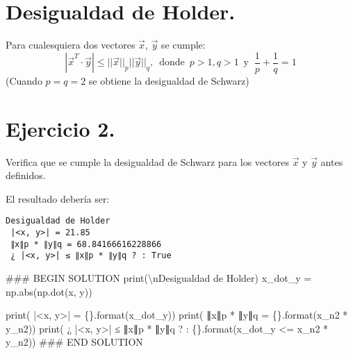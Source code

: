 \documentclass[
  letterpaper,
  DIV=11,
  numbers=noendperiod]{scrreprt}
\newenvironment{Shaded}{\begin{snugshade}}{\end{snugshade}}
\newcommand{\BuiltInTok}[1]{\textcolor[rgb]{0.00,0.23,0.31}{#1}}
\newcommand{\CharTok}[1]{\textcolor[rgb]{0.13,0.47,0.30}{#1}}
\newcommand{\CommentTok}[1]{\textcolor[rgb]{0.37,0.37,0.37}{#1}}
\newcommand{\NormalTok}[1]{\textcolor[rgb]{0.00,0.23,0.31}{#1}}
\newcommand{\OperatorTok}[1]{\textcolor[rgb]{0.37,0.37,0.37}{#1}}
\newcommand{\RegionMarkerTok}[1]{\textcolor[rgb]{0.00,0.23,0.31}{#1}}
\newcommand{\SpecialCharTok}[1]{\textcolor[rgb]{0.37,0.37,0.37}{#1}}
\newcommand{\StringTok}[1]{\textcolor[rgb]{0.13,0.47,0.30}{#1}}
\begin{document}
\section{Desigualdad de Holder.}\label{desigualdad-de-holder.}

Para cualesquiera dos vectores \(\vec{x}\), \(\vec{y}\) se cumple: \[
|\vec{x}^T \cdot \vec{y}| \le ||\vec{x}||_p ||\vec{y}||_q, \,\,\, \mbox{donde}
\,\,\, p > 1, q > 1 \,\,\, \mbox{y} \;\; \frac{1}{p} + \frac{1}{q} = 1
\] (Cuando \(p = q = 2\) se obtiene la desigualdad de Schwarz)

\section{\texorpdfstring{\textbf{Ejercicio
2.}}{Ejercicio 2.}}\label{ejercicio-2.-2}

Verifica que se cumple la desigualdad de Schwarz para los vectores
\(\vec{x}\) y \(\vec{y}\) antes definidos.

El resultado debería ser:

\begin{verbatim}
Desigualdad de Holder
 |<x, y>| = 21.85
 ∥x∥p * ∥y∥q = 68.84166616228866
 ¿ |<x, y>| ≤ ∥x∥p * ∥y∥q ? : True
\end{verbatim}

\begin{Shaded}
\begin{Highlighting}[]
\CommentTok{\#\#\# }\RegionMarkerTok{BEGIN}\CommentTok{ SOLUTION}
\BuiltInTok{print}\NormalTok{(}\StringTok{\textquotesingle{}}\CharTok{\textbackslash{}n}\StringTok{Desigualdad de Holder\textquotesingle{}}\NormalTok{)}
\NormalTok{x\_dot\_y }\OperatorTok{=}\NormalTok{ np.}\BuiltInTok{abs}\NormalTok{(np.dot(x, y))}

\BuiltInTok{print}\NormalTok{(}\StringTok{\textquotesingle{} |\textless{}x, y\textgreater{}| = }\SpecialCharTok{\{\}}\StringTok{\textquotesingle{}}\NormalTok{.}\BuiltInTok{format}\NormalTok{(x\_dot\_y))}
\BuiltInTok{print}\NormalTok{(}\StringTok{\textquotesingle{} ∥x∥p * ∥y∥q = }\SpecialCharTok{\{\}}\StringTok{\textquotesingle{}}\NormalTok{.}\BuiltInTok{format}\NormalTok{(x\_n2 }\OperatorTok{*}\NormalTok{ y\_n2))}
\BuiltInTok{print}\NormalTok{(}\StringTok{\textquotesingle{} ¿ |\textless{}x, y\textgreater{}| ≤ ∥x∥p * ∥y∥q ? : }\SpecialCharTok{\{\}}\StringTok{\textquotesingle{}}\NormalTok{.}\BuiltInTok{format}\NormalTok{(x\_dot\_y }\OperatorTok{\textless{}=}\NormalTok{ x\_n2 }\OperatorTok{*}\NormalTok{ y\_n2))}
\CommentTok{\#\#\# }\RegionMarkerTok{END}\CommentTok{ SOLUTION}
\end{Highlighting}
\end{Shaded}
\end{document}
